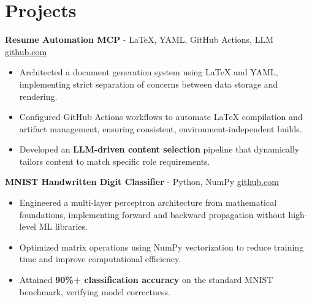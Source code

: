 \documentclass[11pt]{article}
\begin{document}

\vspace{-18.5pt}

\section*{Projects}

\textbf{Resume Automation MCP}{ - LaTeX, YAML, GitHub Actions, LLM} \hfill \href{https://github.com/Monica20030707/Tex_OrangeLeaf-mcp}{github.com}
\vspace{-9pt}
\begin{itemize}
  \item Architected a document generation system using LaTeX and YAML, implementing strict separation of concerns between data storage and rendering.
  \item Configured GitHub Actions workflows to automate LaTeX compilation and artifact management, ensuring consistent, environment-independent builds.
  \item Developed an \textbf{LLM-driven content selection} pipeline that dynamically tailors content to match specific role requirements.
\end{itemize}

\textbf{MNIST Handwritten Digit Classifier}{ - Python, NumPy} \hfill \href{https://github.com/Monica20030707/Artificial-Neutral-Network_ML}{github.com}
\vspace{-9pt}
\begin{itemize}
  \item Engineered a multi-layer perceptron architecture from mathematical foundations, implementing forward and backward propagation without high-level ML libraries.
  \item Optimized matrix operations using NumPy vectorization to reduce training time and improve computational efficiency.
  \item Attained \textbf{90\%+ classification accuracy} on the standard MNIST benchmark, verifying model correctness.
\end{itemize}
\end{document}
